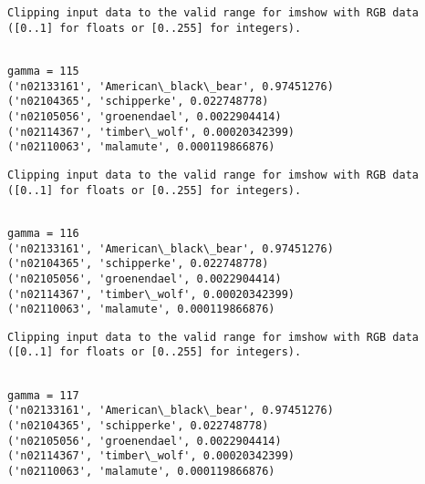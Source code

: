 \documentclass[11pt]{article}
\begin{document}
    \begin{Verbatim}[commandchars=\\\{\}]
Clipping input data to the valid range for imshow with RGB data ([0..1] for floats or [0..255] for integers).

    \end{Verbatim}

    \begin{Verbatim}[commandchars=\\\{\}]

gamma = 115
('n02133161', 'American\_black\_bear', 0.97451276)
('n02104365', 'schipperke', 0.022748778)
('n02105056', 'groenendael', 0.0022904414)
('n02114367', 'timber\_wolf', 0.00020342399)
('n02110063', 'malamute', 0.000119866876)

    \end{Verbatim}

    \begin{Verbatim}[commandchars=\\\{\}]
Clipping input data to the valid range for imshow with RGB data ([0..1] for floats or [0..255] for integers).

    \end{Verbatim}

    \begin{Verbatim}[commandchars=\\\{\}]

gamma = 116
('n02133161', 'American\_black\_bear', 0.97451276)
('n02104365', 'schipperke', 0.022748778)
('n02105056', 'groenendael', 0.0022904414)
('n02114367', 'timber\_wolf', 0.00020342399)
('n02110063', 'malamute', 0.000119866876)

    \end{Verbatim}

    \begin{Verbatim}[commandchars=\\\{\}]
Clipping input data to the valid range for imshow with RGB data ([0..1] for floats or [0..255] for integers).

    \end{Verbatim}

    \begin{Verbatim}[commandchars=\\\{\}]

gamma = 117
('n02133161', 'American\_black\_bear', 0.97451276)
('n02104365', 'schipperke', 0.022748778)
('n02105056', 'groenendael', 0.0022904414)
('n02114367', 'timber\_wolf', 0.00020342399)
('n02110063', 'malamute', 0.000119866876)

    \end{Verbatim}
\end{document}
